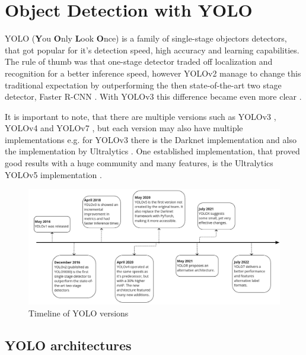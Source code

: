 \section{Object Detection with YOLO}
YOLO (\textbf{Y}ou \textbf{O}nly \textbf{L}ook \textbf{O}nce) is a family of single-stage objectors detectors, that got popular for it's detection speed, high accuracy and learning capabilities. The rule of thumb was that one-stage detector traded off localization and recognition for a better inference speed, however YOLOv2 manage to change this traditional expectation by outperforming the then state-of-the-art two stage detector, Faster R-CNN \cite{yolov2_paper}. With YOLOv3 this difference became even more clear \cite{yolov3_vs}.

It is important to note, that there are multiple versions such as
YOLOv3 \cite{yolov3_paper}, YOLOv4 \cite{yolov4_paper} and YOLOv7 \cite{yolov7_paper}, but each version may also have multiple implementations e.g. for YOLOv3 there is the Darknet implementation \cite{darknet_git} and also the implementation by Ultralytics \cite{yolov3_ultralytics_git}. One established implementation, that proved good results with a huge community and many features, is the Ultralytics YOLOv5 implementation \cite{yolov5_git}.

\begin{figure}[!h]
  \centering
  \captionsetup{justification=centering,margin=2cm}
  \includegraphics[width=\columnwidth]{images/detection/timeline}
  \caption{Timeline of YOLO versions}
  \label{sdfdfd}
\end{figure}


\subsection{YOLO architectures}

